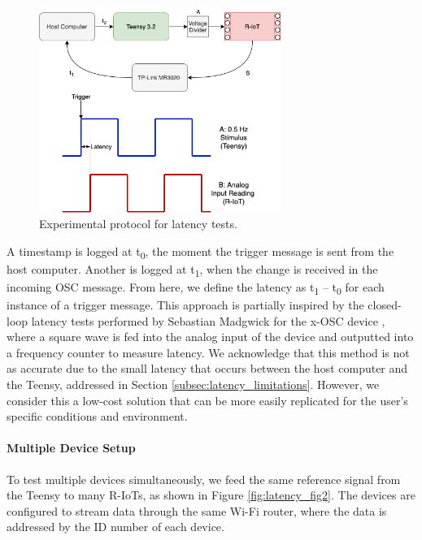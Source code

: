 \begin{figure}[htbp]
  \centering
    \includegraphics[width=0.7\textwidth]{Chapters/Figures/technical/Latency/figure1.png}
    \caption{Experimental protocol for latency tests.}
    \label{fig:latency_fig1}
\end{figure}

A timestamp is logged at t\textsubscript{0}, the moment the trigger message is sent from the host computer. Another is logged at t\textsubscript{1}, when the change is received in the incoming OSC message. From here, we define the latency as t\textsubscript{1} – t\textsubscript{0} for each instance of a trigger message. This approach is partially inspired by the closed-loop latency tests performed by Sebastian Madgwick for the x-OSC device \cite{madgwick_x-osc_2013}, where a square wave is fed into the analog input of the device and outputted into a frequency counter to measure latency. We acknowledge that this method is not as accurate due to the small latency that occurs between the host computer and the Teensy, addressed in Section \ref{subsec:latency_limitations}. However, we consider this a low-cost solution that can be more easily replicated for the user’s specific conditions and environment.

\paragraph{Multiple Device Setup}
To test multiple devices simultaneously, we feed the same reference signal from the Teensy to many R-IoTs, as shown in Figure \ref{fig:latency_fig2}. The devices are configured to stream data through the same Wi-Fi router, where the data is addressed by the ID number of each device.


